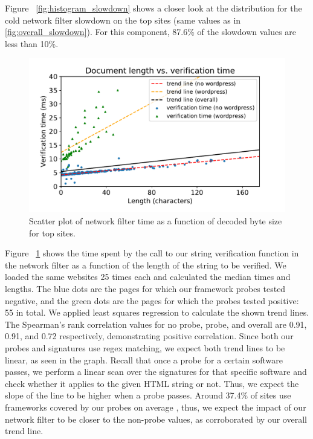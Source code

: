 Figure ~\ref{fig:histogram_slowdown} shows a closer look at the distribution for the cold network filter slowdown on the top sites (same values as in \autoref{fig:overall_slowdown}). For this component, 87.6\% of the slowdown values are less than 10\%.

\begin{figure}[h]
	\includegraphics[scale=0.37]{results/string_length_vs_verification_time_small.pdf}
	\caption{Scatter plot of network filter time as a function of decoded byte size for top sites.}
	\label{fig:verification_time_string_length}
\end{figure}

 Figure ~\ref{fig:verification_time_string_length} shows the time spent by the call to our string verification function in the network filter as a function of the length of the string to be verified. We loaded the same websites 25 times each and calculated the median times and lengths.  The blue dots are the pages for which our framework probes tested negative, and the green dots are the pages for which the probes tested positive: 55 in total. We applied least squares regression to calculate the shown trend lines. The Spearman's rank correlation values for no probe, probe, and overall are 0.91, 0.91, and 0.72 respectively, demonstrating positive correlation. Since both our probes and signatures use regex matching, we expect both trend lines to be linear, as seen in the graph. Recall that once a probe for a certain software passes, we perform a linear scan over the signatures for that specific software and check whether it applies to the given HTML string or not. Thus, we expect the slope of the line to be higher when a probe passes. Around 37.4\% of sites use frameworks covered by our probes on average \cite{w3stats}, thus, we expect the impact of our network filter to be closer to the non-probe values, as corroborated by our overall trend line.

